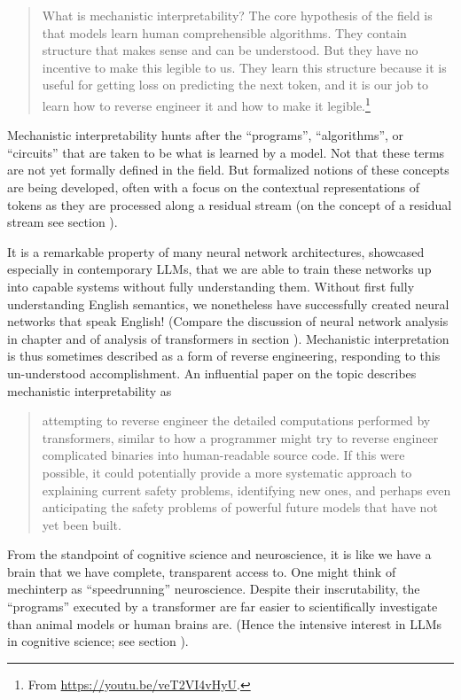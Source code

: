 \begin{quote}
What is mechanistic interpretability? The core hypothesis of the field is that
models learn human comprehensible algorithms. They contain structure that makes
sense and can be understood. But they have no incentive to make this legible to
us. They learn this structure because it is useful for getting loss on
predicting the next token, and it is our job to learn how to reverse engineer
it and how to make it legible.\footnote{From
\url{https://youtu.be/veT2VI4vHyU}.}
\end{quote}
Mechanistic interpretability hunts after the ``programs'', ``algorithms'', or ``circuits''
that are taken to be what is learned by a model. Not that these terms are not yet formally
defined in the field. But formalized notions of these concepts are being
developed, often with a focus on the contextual representations of tokens as they are processed
along a residual stream (on the concept of a residual stream see section
).

It is a remarkable property of many neural network architectures, showcased
especially in contemporary LLMs, that we are able to train these networks up
into capable systems without fully understanding them. Without first fully
understanding English semantics, we nonetheless have successfully created
neural networks that speak English! (Compare the discussion of neural network
analysis in chapter  and of analysis of transformers in
section ). Mechanistic interpretation is thus sometimes
described as a form of reverse engineering, responding to this un-understood
accomplishment. An influential paper on the topic describes mechanistic
interpretability as

\begin{quote}
attempting to reverse engineer the detailed computations performed by
transformers, similar to how a programmer might try to reverse engineer
complicated binaries into human-readable source code.  If this were possible,
it could potentially provide a more systematic approach to explaining current
safety problems, identifying new ones, and perhaps even anticipating the safety
problems of powerful future models that have not yet been
built.\cite{elhage2021mathematical} 
\end{quote}

From the standpoint of cognitive science and neuroscience, it is like we have a
brain that we have complete, transparent access to. One might think of
mechinterp as ``speedrunning'' neuroscience. Despite their
inscrutability, the ``programs'' executed by a transformer are far easier to
scientifically investigate than animal models or human brains are. (Hence the
intensive interest in LLMs in cognitive science; see section
).

